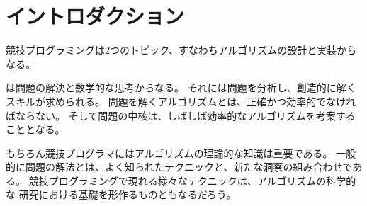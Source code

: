 \begin{comment}
\chapter{Introduction}
\end{comment}
\chapter{イントロダクション}

\begin{comment}
Competitive programming combines two topics:
(1) the design of algorithms and (2) the implementation of algorithms.
\end{comment}

競技プログラミングは2つのトピック、すなわちアルゴリズムの設計と実装からなる。

\begin{comment}
The \key{design of algorithms} consists of problem solving
and mathematical thinking.
Skills for analyzing problems and solving them
creatively are needed.
An algorithm for solving a problem
has to be both correct and efficient,
and the core of the problem is often
about inventing an efficient algorithm.
\end{comment}

は問題の解決と数学的な思考からなる。
それには問題を分析し、創造的に解くスキルが求められる。
問題を解くアルゴリズムとは、正確かつ効率的でなければならない。
そして問題の中核は、しばしば効率的なアルゴリズムを考案することとなる。


\begin{comment}
Theoretical knowledge of algorithms
is important to competitive programmers.
Typically, a solution to a problem is
a combination of well-known techniques and
new insights.
The techniques that appear in competitive programming
also form the basis for the scientific research
of algorithms.
\end{comment}

もちろん競技プログラマにはアルゴリズムの理論的な知識は重要である。
一般的に問題の解法とは、よく知られたテクニックと、新たな洞察の組み合わせである。
競技プログラミングで現れる様々なテクニックは、アルゴリズムの科学的な
研究における基礎を形作るものともなるだろう。

\begin{comment}
The \key{implementation of algorithms} requires good
programming skills.
In competitive programming, the solutions
are graded by testing an implemented algorithm
using a set of test cases.
Thus, it is not enough that the idea of the
algorithm is correct, but the implementation also
has to be correct.
\end{comment}

